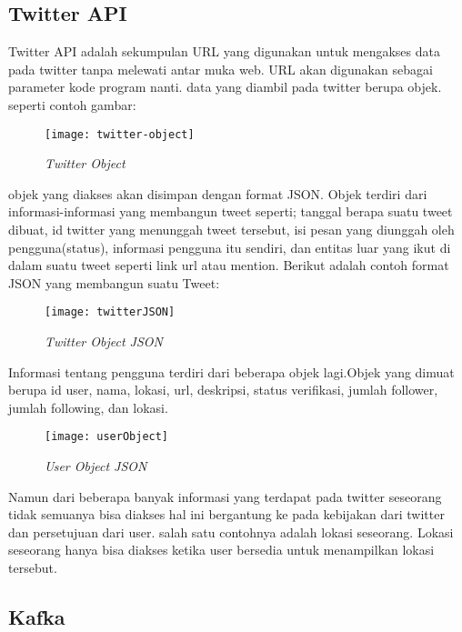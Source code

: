 \subsection{Twitter API}
Twitter API adalah sekumpulan URL yang digunakan untuk mengakses data pada twitter tanpa melewati
antar muka web. URL akan digunakan sebagai parameter kode program nanti. data yang diambil pada twitter berupa objek. seperti contoh gambar:

\begin{figure}[H] 
	\centering  
	\texttt{[image: twitter-object]}  
	\caption[Gambar Twitter Object]{\textit{Twitter Object}} 
	\label{fig:Hadoop-home} 
\end{figure}

objek yang diakses akan disimpan dengan format JSON. Objek terdiri dari informasi-informasi yang membangun tweet seperti; tanggal berapa suatu tweet dibuat, id twitter yang menunggah tweet tersebut, isi pesan yang diunggah oleh pengguna(status), informasi pengguna itu sendiri, dan entitas luar yang ikut di dalam suatu tweet seperti link url atau mention. Berikut adalah contoh format JSON yang membangun suatu Tweet:

\begin{figure}[H] 
	\centering  
	\texttt{[image: twitterJSON]}  
	\caption[Gambar Twitter Object]{\textit{Twitter Object JSON}} 
	\label{fig:Hadoop-home} 
\end{figure}

Informasi tentang pengguna terdiri dari beberapa objek lagi.Objek yang dimuat berupa id user, nama,
lokasi, url, deskripsi, status verifikasi, jumlah follower, jumlah following, dan lokasi.
 
\begin{figure}[H] 
	\centering  
	\texttt{[image: userObject]}  
	\caption[Gambar Twitter Object]{\textit{User Object JSON}} 
	\label{fig:Hadoop-home} 
\end{figure}

Namun dari beberapa banyak informasi yang terdapat pada twitter seseorang tidak semuanya bisa diakses hal ini bergantung ke pada kebijakan dari twitter dan persetujuan dari user. salah satu contohnya adalah lokasi seseorang. Lokasi seseorang hanya bisa diakses ketika user bersedia untuk menampilkan lokasi tersebut.

\subsection{Kafka}
 
